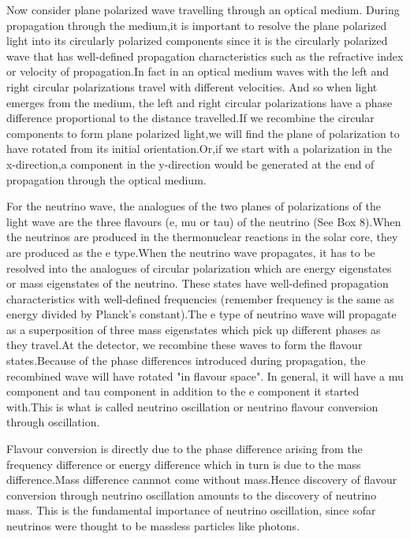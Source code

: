 Now consider plane polarized wave travelling through an optical medium.
During propagation through the medium,it is important to resolve the
plane polarized light into its circularly polarized components
since it is the circularly polarized wave that has well-defined
propagation characteristics such as the refractive index or velocity of
propagation.In fact in an optical medium waves with the left
and right circular polarizations travel with different velocities.
And so when light emerges from the medium, the left and right
circular polarizations have a phase difference proportional
to the distance travelled.If we recombine the circular
components to form plane polarized light,we will find the
plane of polarization to have rotated from its initial
orientation.Or,if we start with a polarization in the
x-direction,a component in the y-direction would be
generated at the end of propagation through the optical medium.

For the neutrino wave, the analogues of the two planes of
polarizations of the light wave are the three flavours (e,
mu or tau) of the neutrino (See Box 8).When the neutrinos are produced
in the thermonuclear reactions in the solar core, they are
produced as the e type.When the neutrino wave propagates,
it has to be resolved into the analogues of circular polarization
which are energy eigenstates or mass eigenstates of the neutrino.
These states have well-defined propagation characteristics with
well-defined frequencies (remember frequency is the same as energy
divided by Planck's constant).The e type of neutrino wave will
propagate as a superposition of three mass eigenstates which
pick up different phases as they travel.At the detector, we
recombine these waves to form the flavour states.Because of
the phase differences introduced during propagation, the
recombined wave will have rotated "in flavour space". In general,
it will have a mu component and tau component in addition to
the e component it started with.This is what is called neutrino
oscillation or neutrino flavour conversion through oscillation.

Flavour conversion is directly due to the phase difference
arising from the frequency difference or energy difference
which in turn is due to the mass difference.Mass difference
cannnot come without mass.Hence discovery of flavour conversion
through neutrino oscillation amounts to the discovery of
neutrino mass. This is the fundamental importance of neutrino
oscillation, since sofar neutrinos were thought to be massless
particles like photons.

